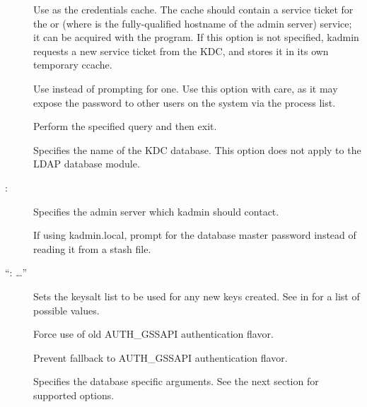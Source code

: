 \documentclass[letterpaper,10pt,english]{sphinxmanual}
\begin{document}
\begin{description}
\item[{ }] \leavevmode
Use  as the credentials cache.  The cache
should contain a service ticket for the  or
 (where  is the fully-qualified
hostname of the admin server) service; it can be acquired with the
 program.  If this option is not specified, kadmin
requests a new service ticket from the KDC, and stores it in its
own temporary ccache.

\item[{ }] \leavevmode
Use  instead of prompting for one.  Use this option with
care, as it may expose the password to other users on the system
via the process list.

\item[{ }] \leavevmode
Perform the specified query and then exit.

\item[{ }] \leavevmode
Specifies the name of the KDC database.  This option does not
apply to the LDAP database module.

\item[{ \sphinxstyleemphasis{admin\_server}{[}:\sphinxstyleemphasis{port}{]}}] \leavevmode
Specifies the admin server which kadmin should contact.

\item[{}] \leavevmode
If using kadmin.local, prompt for the database master password
instead of reading it from a stash file.

\item[{ “: …”}] \leavevmode
Sets the keysalt list to be used for any new keys created.  See
{\hyperref[\detokenize{admin/conf_files/kdc_conf:keysalt-lists}]{}} in {\hyperref[\detokenize{admin/conf_files/kdc_conf:kdc-conf-5}]{}} for a list of possible
values.

\item[{}] \leavevmode
Force use of old AUTH\_GSSAPI authentication flavor.

\item[{}] \leavevmode
Prevent fallback to AUTH\_GSSAPI authentication flavor.

\item[{ }] \leavevmode
Specifies the database specific arguments.  See the next section
for supported options.

\end{description}
\end{document}
